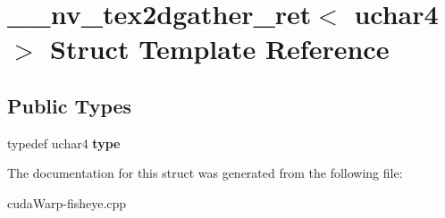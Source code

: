 \hypertarget{struct____nv__tex2dgather__ret_3_01uchar4_01_4}{}\section{\+\_\+\+\_\+nv\+\_\+tex2dgather\+\_\+ret$<$ uchar4 $>$ Struct Template Reference}
\label{struct____nv__tex2dgather__ret_3_01uchar4_01_4}
\subsection*{Public Types}
\begin{DoxyCompactItemize}
\item 
typedef uchar4 {\bfseries type}\hypertarget{struct____nv__tex2dgather__ret_3_01uchar4_01_4_a56cff1a02d4278102dc92de4801b1dd8}{}\label{struct____nv__tex2dgather__ret_3_01uchar4_01_4_a56cff1a02d4278102dc92de4801b1dd8}

\end{DoxyCompactItemize}


The documentation for this struct was generated from the following file\+:\begin{DoxyCompactItemize}
\item 
cuda\+Warp-\/fisheye.\+cpp\end{DoxyCompactItemize}
